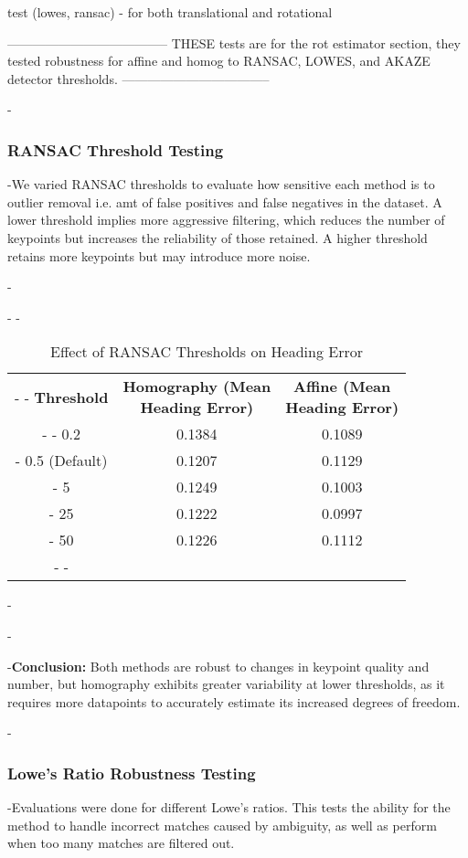

test (lowes, ransac) - for both translational and rotational




--------------------------------------
THESE tests are for the rot estimator section, they tested robustness for affine and homog to RANSAC, LOWES, and AKAZE detector thresholds. 
-----------------------------------

-\subsubsection{RANSAC Threshold Testing}
-We varied RANSAC thresholds to evaluate how sensitive each method is to outlier removal i.e. amt of false positives and false negatives in the dataset. A lower threshold implies more aggressive filtering, which reduces the number of keypoints but increases the reliability of those retained. A higher threshold retains more keypoints but may introduce more noise.

-\begin{table}[H]
-    \centering
-    \begin{tabular}{|c|c|c|}
-        \hline
-        \textbf{Threshold} & \makecell{\textbf{Homography (Mean} \\ \textbf{Heading Error)}} & \makecell{\textbf{Affine (Mean} \\ \textbf{Heading Error)}} \\
-        \hline
-        0.2 & 0.1384 & 0.1089 \\
-        0.5 (Default) & 0.1207 & 0.1129 \\
-        5 & 0.1249 & 0.1003 \\
-        25 & 0.1222 & 0.0997 \\
-        50 & 0.1226 & 0.1112 \\
-        \hline
-    \end{tabular}
-    \caption{Effect of RANSAC Thresholds on Heading Error}
-\end{table}

-\textbf{Conclusion:} Both methods are robust to changes in keypoint quality and number, but homography exhibits greater variability at lower thresholds, as it requires more datapoints to accurately estimate its increased degrees of freedom.

-\subsubsection{Lowe's Ratio Robustness Testing}
-Evaluations were done for different Lowe's ratios. This tests the ability for the method to handle incorrect matches caused by ambiguity, as well as perform when too many matches are filtered out.

